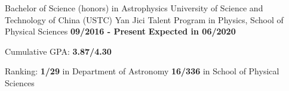 
\begin{cventries}
  \cventry
    {\textnormal{Bachelor of Science (honors) in Astrophysics}} 
    {University of Science and Technology of China (USTC)\newline
    \textnormal{Yan Jici Talent Program in Physics, School of Physical Sciences}} 
    {\textcolor{awesome-emerald}{\textbf{09/2016 - Present}}}
    {\textcolor{awesome-emerald}{\textbf{Expected in 06/2020}}}
    {
      \begin{cvitems} %
         \item{\textnormal{Cumulative GPA:} \textbf{3.87/4.30}}
         \item{\textnormal{Ranking:} \textbf{1/29} \textnormal{in Department of Astronomy}
         \newline
         \hspace{1.3cm}\textbf{16/336} \textnormal{in School of Physical Sciences}}
      \end{cvitems}
    }
  \vspace{-0.4cm}
\end{cventries}
